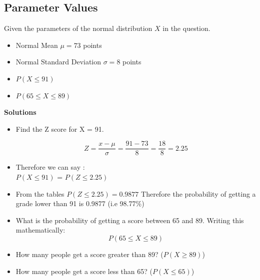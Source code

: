 \documentclass[]{report}
\begin{document}
	
	
	

	
	
	
	
	
	
	
	
	
	
	
	
	
	
	
	
	



\subsection*{Parameter Values}

Given the parameters of the normal distribution $X$ in the question.
\begin{itemize}
	\item Normal Mean $\mu = 73$ points
	\item Normal Standard Deviation $\sigma = 8$ points
\end{itemize}

\begin{itemize}
	\item $P(X \leq 91)$
	\item $P(65 \leq X \leq 89)$
\end{itemize}

\noindent \textbf{Solutions}
\begin{itemize}
	\item Find the Z score for X = 91.
	
	\[ Z = \frac{x- \mu}{ \sigma} = \frac{91 - 73}{8} =\frac{18}{8} = 2.25\]
	\item Therefore we can say :\\ $P(X \leq 91)$ = $P(Z \leq 2.25)$ \\
	
	
	\item From the tables $P(Z \leq 2.25) = 0.9877$
	Therefore the probability of getting a grade lower than 91 is 0.9877 (i.e 98.77\%)
	
	
	\item What is the probability of getting a score between 65 and 89.
	Writing this mathematically:
	\[ P(65 \leq X \leq 89) \]
\end{itemize}

	
	
	
	\begin{itemize}
		\item How many people get a score greater than 89? ($P(X\geq 89)$)
		\item How many people get a score less than 65? ($P(X\leq 65)$)
	\end{itemize}
	
\end{document}
